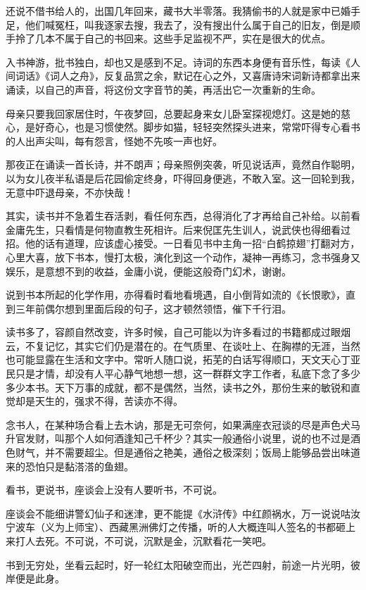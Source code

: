 \par 还说不借书给人的，出国几年回来，藏书大半零落。我猜偷书的人就是家中已婚手足，他们喊冤枉，叫我逐家去搜，我去了，没有搜出什么属于自己的旧友，倒是顺手拎了几本不属于自己的书回来。这些手足监视不严，实在是很大的优点。
\par 入书神游，批书独白，却也又是感到不足。诗词的东西本身便有音乐性，每读《人间词话》《词人之舟》，反复品赏之余，默记在心之外，又喜唐诗宋词新诗都拿出来诵读，以自己的声音，将这份文字音节的美，再活出它一次重新的生命。
\par 母亲只要我回家居住时，午夜梦回，总要起身来女儿卧室探视熄灯。这是她的慈心，是好奇心，也是习惯使然。脚步如猫，轻轻突然探头进来，常常吓得专心看书的人出声尖叫，每有怨言，怪她不先咳一声也好。
\par 那夜正在诵读一首长诗，并不朗声；母亲照例突袭，听见说话声，竟然自作聪明，以为女儿夜半私语是后花园偷定终身，吓得回身便逃，不敢入室。这一回轮到我，无意中吓退母亲，不亦快哉！
\par 其实，读书并不急着生吞活剥，看任何东西，总得消化了才再给自己补给。以前看金庸先生，只看情是何物直教生死相许。后来倪匡先生训人，说武侠也得细看过招。他的话有道理，应该虚心接受。一日看见书中主角一招“白鹤掠翅”打翻对方，心里大喜，放下书本，慢打太极，演化到这一个动作，凝神一再练习，念书强身又娱乐，是意想不到的收益，金庸小说，便能这般奇门幻术，谢谢。
\par 说到书本所起的化学作用，亦得看时看地看境遇，自小倒背如流的《长恨歌》，直到三年前偶尔想到里面后段的句子，这才顿然领悟，催下千行泪。
\par 读书多了，容颜自然改变，许多时候，自己可能以为许多看过的书籍都成过眼烟云，不复记忆，其实它们仍是潜在的。在气质里、在谈吐上、在胸襟的无涯，当然也可能显露在生活和文字中。常听人随口说，拓芜的白话写得顺口，天文天心丁亚民只是才情，却没有人平心静气地想一想，这一群群文字工作者，私底下念了多少多少本书。天下万事的成就，都不是偶然，当然，读书之外，那份生来的敏锐和直觉却是天生的，强求不得，苦读亦不得。
\par 念书人，在某种场合看上去木讷，那是无可奈何，如果满座衣冠谈的尽是声色犬马升官发财，叫那个人如何酒逢知己千杯少？其实一般通俗小说里，说的也不过是酒色财气，并不需要超尘。但是通俗之艳美，通俗之极深刻；饭局上能够品尝出味道来的恐怕只是黏溚溚的鱼翅。
\par 看书，更说书，座谈会上没有人要听书，不可说。
\par 座谈会不能细讲警幻仙子和迷津，更不能提《水浒传》中红颜祸水，万一说说咕汝宁波车（义为上师宝）、西藏黑洲佛灯之传播，听的人大概连叫人签名的书都砸上来打人去死。不可说，不可说，沉默是金，沉默看花一笑吧。
\par 书到无穷处，坐看云起时，好一轮红太阳破空而出，光芒四射，前途一片光明，彼岸便是此身。
